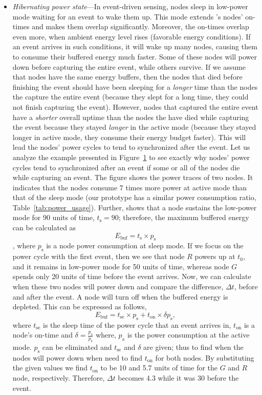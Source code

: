 \begin{itemize}
\begin{figure}
{		}
		\label{fig:noRand}
\end{figure} 
%
		\item \label{it:hibernating} \textit{Hibernating power state}---In event-driven sensing, nodes sleep in low-power mode waiting for an event to wake them up. This mode extends \cis's nodes' on-times and makes them overlap significantly. Moreover, the on-times overlap even more, when ambient energy level rises (favorable energy conditions). If an event arrives in such conditions, it will wake up many nodes, causing them to consume their buffered energy much faster. Some of these nodes will power down before capturing the entire event, while others survive. If we assume that nodes have the same energy buffers, then the nodes that died before finishing the event should have been sleeping for a \emph{longer} time than the nodes the capture the entire event (because they slept for a long time, they could not finish capturing the event). However, nodes that captured the entire event have a \emph{shorter} overall uptime than the nodes the have died while capturing the event because they stayed \emph{longer} in the active mode (because they stayed longer in active mode, they consume their energy budget faster). This will lead the nodes' power cycles to tend to synchronized after the event. Let us analyze the example presented in Figure~\ref{fig:noRand} to see exactly why nodes' power cycles tend to synchronized after an event if some or all of the nodes die while capturing an event. The figure shows the power traces of two nodes. It indicates that the nodes consume 7 times more power at active mode than that of the sleep mode (our prototype has a similar power consumption ratio, Table~\ref{tab:power_usage}). Further, shows that a node sustains the low-power mode for 90 units of time, $t_\text{s} = 90$; therefore, the maximum buffered energy can be calculated as 
		$$E_\text{buf}=t_\text{s} \times p_\text{s}$$
		, where $p_\text{s}$ is a node power consumption at sleep mode. If we focus on the power cycle with the first event, then we see that node $R$ powers up at $t_\text{0}$, and it remains in low-power mode for 50 units of time, whereas node $G$ spends only 20 units of time before the event arrives. Now, we can calculate when these two nodes will power down and compare the difference, $\Delta t$, before and after the event. A node will turn off when the buffered energy is depleted. This can be expressed as follows, 
		$$
		E_\text{buf} = t_\text{se} \times p_\text{s} + t_\text{on} \times \delta p_\text{s},
		$$
		where $ t_\text{se}$ is the sleep time of the power cycle that an event arrives in, $t_\text{on}$ is a node's on-time and $\delta = \frac{ p_\text{a}}{ p_\text{s}}$ where, $p_\text{a}$ is the power consumption at the active mode. $p_\text{s}$ can be eliminated and $ t_\text{se}$ and $ \delta$ are given; thus to find when the nodes will power down when need to find $t_\text{on}$ for both nodes. By substituting the given values we find $t_\text{on}$ to be 10 and 5.7 units of time for the $G$ and $R$ node, respectively. Therefore, $\Delta t$ becomes 4.3 while it was 30 before the event. 


\end{itemize}
